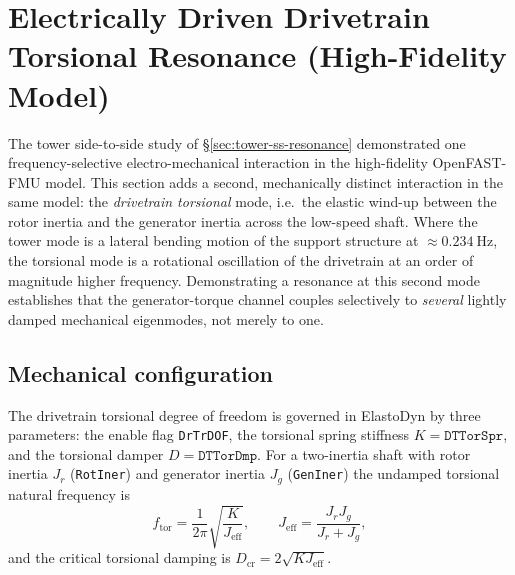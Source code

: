 
\section{Electrically Driven Drivetrain Torsional Resonance (High-Fidelity Model)}
\label{sec:fmu-torsion-resonance}

The tower side-to-side study of \S\ref{sec:tower-ss-resonance} demonstrated one
frequency-selective electro-mechanical interaction in the high-fidelity
OpenFAST-FMU model. This section adds a second, mechanically distinct
interaction in the same model: the \emph{drivetrain torsional} mode, i.e.\ the
elastic wind-up between the rotor inertia and the generator inertia across the
low-speed shaft. Where the tower mode is a lateral bending motion of the
support structure at \(\approx\SI{0.234}{\hertz}\), the torsional mode is a
rotational oscillation of the drivetrain at an order of magnitude higher
frequency. Demonstrating a resonance at this second mode establishes that the
generator-torque channel couples selectively to \emph{several} lightly damped
mechanical eigenmodes, not merely to one.

\subsection{Mechanical configuration}
\label{subsec:tors-config}

The drivetrain torsional degree of freedom is governed in ElastoDyn by three
parameters: the enable flag \texttt{DrTrDOF}, the torsional spring stiffness
\(K=\texttt{DTTorSpr}\), and the torsional damper \(D=\texttt{DTTorDmp}\). For a
two-inertia shaft with rotor inertia \(J_r\) (\texttt{RotIner}) and generator
inertia \(J_g\) (\texttt{GenIner}) the undamped torsional natural frequency is
\begin{equation}
  f_{\mathrm{tor}}
  = \frac{1}{2\pi}\sqrt{\frac{K}{J_{\mathrm{eff}}}},
  \qquad
  J_{\mathrm{eff}} = \frac{J_r J_g}{J_r + J_g},
  \label{eq:tors-fn}
\end{equation}
and the critical torsional damping is \(D_{\mathrm{cr}} = 2\sqrt{K J_{\mathrm{eff}}}\).

